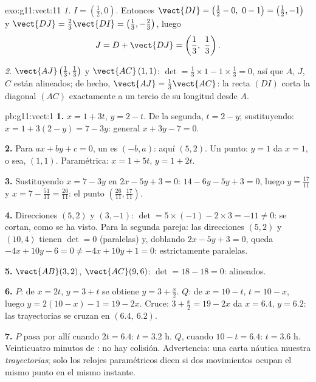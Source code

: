 \begin{solution}{exo:g11:vect:11}
\emph{1.} $I = \left(\frac12, 0\right)$. Entonces
$\vect{DI} = \left(\frac12 - 0,\ 0 - 1\right) = \left(\frac12, -1\right)$
y $\vect{DJ} = \frac23\vect{DI} = \left(\frac13, -\frac23\right)$, luego
\[
J = D + \vect{DJ} = \left(\frac13,\ \frac13\right).
\]

\emph{2.} $\vect{AJ}\left(\frac13, \frac13\right)$ y $\vect{AC}\,(1, 1)$:
$\det = \frac13 \times 1 - 1 \times \frac13 = 0$, así que $A$, $J$, $C$
están alineados; de hecho, $\vect{AJ} = \frac13\vect{AC}$: la recta $(DI)$
corta la diagonal $(AC)$ exactamente a un tercio de su longitud desde
$A$.
\end{solution}

\begin{solution}{pb:g11:vect:1}
\textbf{1.} $x = 1 + 3t$, $y = 2 - t$. De la segunda, $t = 2 - y$;
sustituyendo: $x = 1 + 3(2 - y) = 7 - 3y$:  general
$x + 3y - 7 = 0$.

\textbf{2.} Para $ax + by + c = 0$, un  es $(-b, a)$: aquí
$(5, 2)$. Un punto: $y = 1$ da $x = 1$, o sea, $(1, 1)$. Paramétrica:
$x = 1 + 5t$, $y = 1 + 2t$.

\textbf{3.} Sustituyendo $x = 7 - 3y$ en $2x - 5y + 3 = 0$:
$14 - 6y - 5y + 3 = 0$, luego $y = \frac{17}{11}$ y
$x = 7 - \frac{51}{11} = \frac{26}{11}$: el punto
$\left(\frac{26}{11}, \frac{17}{11}\right)$.

\textbf{4.} Direcciones $(5, 2)$ y $(3, -1)$:
$\det = 5 \times (-1) - 2 \times 3 = -11 \neq 0$: se cortan, como se ha
visto. Para la segunda pareja: las direcciones $(5, 2)$ y $(10, 4)$ tienen
$\det = 0$ (paralelas) y, doblando $2x - 5y + 3 = 0$, queda
$-4x + 10y - 6 = 0 \neq -4x + 10y + 1 = 0$: estrictamente paralelas.

\textbf{5.} $\vect{AB}(3, 2)$, $\vect{AC}(9, 6)$:
$\det = 18 - 18 = 0$: alineados.

\textbf{6.} $P$: de $x = 2t$, $y = 3 + t$ se obtiene
$y = 3 + \frac x2$. $Q$: de $x = 10 - t$, $t = 10 - x$, luego
$y = 2(10 - x) - 1 = 19 - 2x$. Cruce: $3 + \frac x2 = 19 - 2x$ da
$x = 6.4$, $y = 6.2$: las trayectorias se cruzan en $(6.4,\ 6.2)$.

\textbf{7.} $P$ pasa por allí cuando $2t = 6.4$: $t = 3.2$ h. $Q$, cuando
$10 - t = 6.4$: $t = 3.6$ h. Veinticuatro minutos de : no hay
colisión. Advertencia: una carta náutica muestra \emph{trayectorias}; solo
los relojes paramétricos dicen si dos movimientos ocupan el mismo punto en
el mismo instante.


\end{solution}
